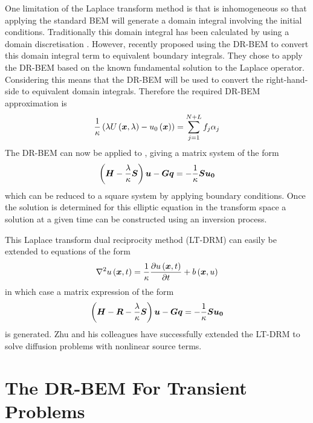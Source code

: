 One limitation of the Laplace transform method is that 
is inhomogeneous so that applying the standard BEM will generate a domain
integral involving the initial conditions.  Traditionally this domain
integral has been calculated by using a domain discretisation
\cite{brebbia:1984}.  However, recently  proposed
using the DR-BEM to convert this domain integral term to equivalent
boundary integrals.  They chose to apply the DR-BEM based on the known
fundamental solution to the Laplace operator.  Considering
 this means that the DR-BEM will be used to convert the
right-hand-side to equivalent domain integrals.  Therefore the required
DR-BEM approximation is
\begin{equation}
  \dfrac{1}{\kappa} \pbrac{\lambda \fnof{U}{\vect{x},\lambda} -
    \fnof{u_{0}}{\vect{x}}} = \dsuml{j=1}{N+L} f_{j}\alpha_{j}
\label{eq:drmapprox}
\end{equation}
The DR-BEM can now be applied to , giving a matrix
system of the form
\begin{equation}
  \pbrac{\matr{H} - \dfrac{\lambda}{\kappa}\matr{S}} \vect{U} - \matr{G}
  \vect{q} = -\dfrac{1}{\kappa} \matr{S} \vect{u_{0}}
\end{equation}
which can be reduced to a square system by applying boundary conditions.
Once the solution is determined for this elliptic equation in the transform
space a solution at a given time can be constructed using an inversion
process.

This Laplace transform dual reciprocity method (LT-DRM) can easily be
extended to equations of the form
\begin{equation}
  \laplacian{\fnof{u}{\vect{x},t}} = \dfrac{1}{\kappa}
  \delby{\fnof{u}{\vect{x},t}}{t} + \fnof{b}{\vect{x},u}
\end{equation}
in which case a matrix expression of the form 
\begin{equation}
  \pbrac{\matr{H} -\matr{R} - \dfrac{\lambda}{\kappa}\matr{S}} \vect{U}
  - \matr{G} \vect{q} = -\dfrac{1}{\kappa} \matr{S} \vect{u_{0}}
\end{equation}
is generated.  Zhu and his colleagues have successfully extended the LT-DRM
to solve diffusion problems with nonlinear source terms.

\section{The DR-BEM For Transient Problems}
\label{sec:drmtrans}

